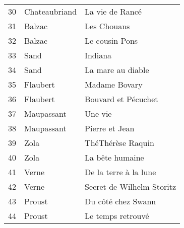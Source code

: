 \begin{table}[H]
\begin{tabular}{l l l}
    30 & Chateaubriand & La vie de Rancé \\
    31 & Balzac & Les Chouans \\
    32 & Balzac & Le cousin Pons \\
    33 & Sand & Indiana \\
    34 & Sand & La mare au diable \\
    35 & Flaubert & Madame Bovary \\
    36 & Flaubert & Bouvard et Pécuchet \\
    37 & Maupassant & Une vie \\
    38 & Maupassant & Pierre et Jean \\
    39 & Zola & ThéThérèse Raquin \\
    40 & Zola & La bête humaine \\
    41 & Verne & De la terre à la lune \\
    42 & Verne & Secret de Wilhelm Storitz \\
    43 & Proust & Du côté chez Swann \\
    44 & Proust & Le temps retrouvé \\
    \bottomrule
  \end{tabular}
\end{table}

\onecolumn

